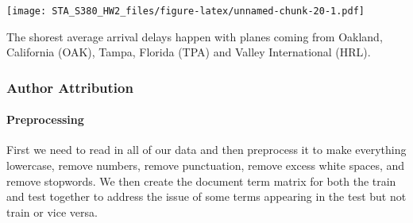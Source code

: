 \documentclass[]{article}
\newenvironment{Shaded}{\begin{snugshade}}{\end{snugshade}}
\newcommand{\KeywordTok}[1]{\textcolor[rgb]{0.13,0.29,0.53}{\textbf{#1}}}
\newcommand{\DataTypeTok}[1]{\textcolor[rgb]{0.13,0.29,0.53}{#1}}
\newcommand{\DecValTok}[1]{\textcolor[rgb]{0.00,0.00,0.81}{#1}}
\newcommand{\StringTok}[1]{\textcolor[rgb]{0.31,0.60,0.02}{#1}}
\newcommand{\CommentTok}[1]{\textcolor[rgb]{0.56,0.35,0.01}{\textit{#1}}}
\newcommand{\OperatorTok}[1]{\textcolor[rgb]{0.81,0.36,0.00}{\textbf{#1}}}
\newcommand{\NormalTok}[1]{#1}
\let\oldparagraph\paragraph
\renewcommand{\paragraph}[1]{\oldparagraph{#1}\mbox{}}
\begin{document}
\begin{Shaded}
\end{Shaded}

\texttt{[image: STA\_S380\_HW2\_files/figure-latex/unnamed-chunk-20-1.pdf]}

The shorest average arrival delays happen with planes coming from
Oakland, California (OAK), Tampa, Florida (TPA) and Valley International
(HRL).

\subsubsection{Author Attribution}\label{author-attribution}

\paragraph{Preprocessing}\label{preprocessing}

First we need to read in all of our data and then preprocess it to make
everything lowercase, remove numbers, remove punctuation, remove excess
white spaces, and remove stopwords. We then create the document term
matrix for both the train and test together to address the issue of some
terms appearing in the test but not train or vice versa.
\end{document}
